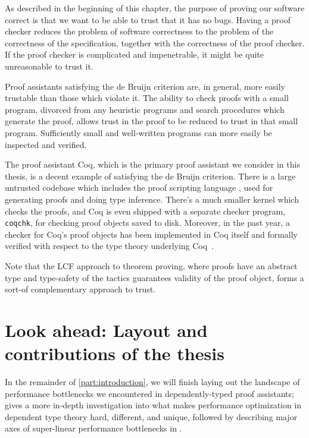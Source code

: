 As described in the beginning of this chapter, the purpose of proving our software correct is that we want to be able to trust that it has no bugs.
Having a proof checker reduces the problem of software correctness to the problem of the correctness of the specification, together with the correctness of the proof checker.
If the proof checker is complicated and impenetrable, it might be quite unreasonable to trust it.

Proof assistants satisfying the de Bruijn criterion are, in general, more easily trustable than those which violate it.
The ability to check proofs with a small program, divorced from any heuristic programs and search procedures which generate the proof, allows trust in the proof to be reduced to trust in that small program.
Sufficiently small and well-written programs can more easily be inspected and verified.


The proof assistant Coq, which is the primary proof assistant we consider in this thesis, is a decent example of satisfying the de Bruijn criterion.
There is a large untrusted codebase which includes the proof scripting language \Ltac, used for generating proofs and doing type inference.
\label{sec:ltac-first-mention}
There's a much smaller kernel which checks the proofs, and Coq is even shipped with a separate checker program, \texttt{coqchk}, for checking proof objects saved to disk.
Moreover, in the past year, a checker for Coq's proof objects has been implemented in Coq itself and formally verified with respect to the type theory underlying Coq~\cite{Coq2019Sozeau}.

Note that the LCF approach to theorem proving, where proofs have an abstract type and type-safety of the tactics guarantees validity of the proof object, forms a sort-of complementary approach to trust.


\section{Look ahead: Layout and contributions of the thesis}\label{sec:intro:layout}
In the remainder of \autoref{part:introduction}, we will finish laying out the landscape of performance bottlenecks we encountered in dependently-typed proof assistants;
 gives a more in-depth investigation into what makes performance optimization in dependent type theory hard, different, and unique, followed by describing major axes of super-linear performance bottlenecks in .

